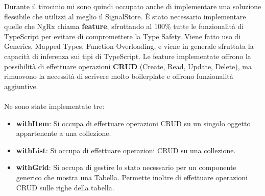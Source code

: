 Durante il tirocinio mi sono quindi occupato anche di implementare una soluzione flessibile che utilizzi al meglio il SignalStore.
\`E stato necessario implementare quelle che NgRx chiama \textbf{feature}, sfruttando al 100\% tutte le funzionalit\`a di TypeScript per evitare di compromettere la Type Safety.
Viene fatto uso di Generics, Mapped Types, Function Overloading, e viene in generale sfruttata la capacit\`a di inferenza sui tipi di TypeScript.
Le feature implementate offrono la possibilit\`a di effettuare operazioni \textbf{CRUD} (Create, Read, Update, Delete), ma rimuovono la necessit\`a di scrivere molto boilerplate e offrono funzionalit\`a aggiuntive.
\\\\
Ne sono state implementate tre:
\begin{itemize}
  \item \textbf{withItem}: Si occupa di effettuare operazioni CRUD su un singolo oggetto appartenente a una collezione.
  \item \textbf{withList}: Si occupa di effettuare operazioni CRUD su una collezione.
  \item \textbf{withGrid}: Si occupa di gestire lo stato necessario per un componente generico che mostra una Tabella. Permette inoltre di effettuare operazioni CRUD sulle righe
    della tabella.
\end{itemize}

